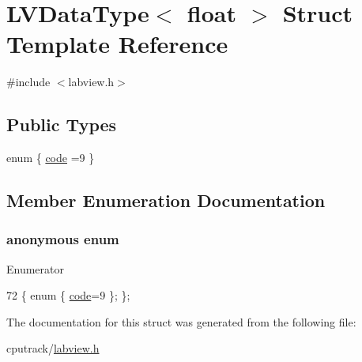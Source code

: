 \hypertarget{struct_l_v_data_type_3_01float_01_4}{}\section{L\+V\+Data\+Type$<$ float $>$ Struct Template Reference}
\label{struct_l_v_data_type_3_01float_01_4}


{\ttfamily \#include $<$labview.\+h$>$}

\subsection*{Public Types}
\begin{DoxyCompactItemize}
\item 
enum \{ \hyperlink{struct_l_v_data_type_3_01float_01_4_a7da8e4be6a1242e72e4669e71977d2c8a0e14db1c1c23a7dd33d535c8637cbb51}{code} =9
 \}
\end{DoxyCompactItemize}


\subsection{Member Enumeration Documentation}
\subsubsection[{\texorpdfstring{anonymous enum}{anonymous enum}}]{\setlength{\rightskip}{0pt plus 5cm}anonymous enum}\hypertarget{struct_l_v_data_type_3_01float_01_4_a7da8e4be6a1242e72e4669e71977d2c8}{}\label{struct_l_v_data_type_3_01float_01_4_a7da8e4be6a1242e72e4669e71977d2c8}
\begin{Desc}
\item[Enumerator]\par
\begin{description}
\item[{\em 
code\hypertarget{struct_l_v_data_type_3_01float_01_4_a7da8e4be6a1242e72e4669e71977d2c8a0e14db1c1c23a7dd33d535c8637cbb51}{}\label{struct_l_v_data_type_3_01float_01_4_a7da8e4be6a1242e72e4669e71977d2c8a0e14db1c1c23a7dd33d535c8637cbb51}
}]\end{description}
\end{Desc}

\begin{DoxyCode}
72 \{ \textcolor{keyword}{enum} \{ \hyperlink{struct_l_v_data_type_3_01float_01_4_a7da8e4be6a1242e72e4669e71977d2c8a0e14db1c1c23a7dd33d535c8637cbb51}{code}=9 \}; \};
\end{DoxyCode}


The documentation for this struct was generated from the following file\+:\begin{DoxyCompactItemize}
\item 
cputrack/\hyperlink{labview_8h}{labview.\+h}\end{DoxyCompactItemize}
